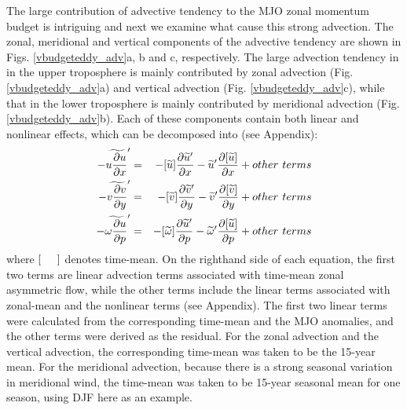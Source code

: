 \documentclass[12pt]{article}
\begin{document}
The large contribution of advective tendency to the MJO zonal momentum
budget is intriguing and next we examine what cause this strong
advection.
The zonal, meridional and vertical components of the advective tendency 
are shown in Figs. \ref{vbudgeteddy_adv}a, b and c, respectively.
The large advection tendency in in the upper troposphere is mainly
contributed by zonal advection (Fig. \ref{vbudgeteddy_adv}a) and vertical
advection (Fig. \ref{vbudgeteddy_adv}c), while that in the lower
troposphere is mainly contributed by meridional advection
(Fig. \ref{vbudgeteddy_adv}b).  
Each of these components
contain both linear and nonlinear effects, which can be decomposed into
(see Appendix):
\begin{eqnarray}
- \widetilde{u \frac{\partial u}{\partial x}} ' & = &
- [\widetilde{u}] \frac{\partial \widetilde{u} '}{\partial x} 
- \widetilde{u} ' \frac{\partial [\widetilde{u}]}{\partial x}
+ other \hspace*{0.05in}terms
\label{eqn_adv_u}
\\
- \widetilde{v \frac{\partial v}{\partial y}} ' & = &
- [\widetilde{v}] \frac{\partial \widetilde{v} '}{\partial y} 
- \widetilde{v} ' \frac{\partial [\widetilde{v}]}{\partial y}
+ other \hspace*{0.05in}terms
\label{eqn_adv_v}
\\
- \widetilde{\omega \frac{\partial u}{\partial p}} ' & = &
- [\widetilde{\omega}] \frac{\partial \widetilde{u} '}{\partial p}
- \widetilde{\omega} ' \frac{\partial [\widetilde{u}]}{\partial p}
+ other \hspace*{0.05in}terms
\label{eqn_adv_w}
\end{eqnarray}
where $[ \hspace*{0.2in}]$ denotes time-mean.
On the righthand side of each equation, the first two terms are linear
advection terms associated with time-mean zonal asymmetric flow,
while the other terms include the linear terms associated with zonal-mean
and the nonlinear terms (see Appendix).
The first two linear terms 
were calculated from the corresponding time-mean 
and the MJO anomalies, and
the other terms were derived as the residual.
For the zonal advection and the vertical advection, the corresponding time-mean
was taken to be the 15-year mean.
For the meridional advection, because there is a strong seasonal variation
in meridional wind, the time-mean was taken to be 15-year seasonal mean
for one season, using DJF here as an example.
\end{document}
